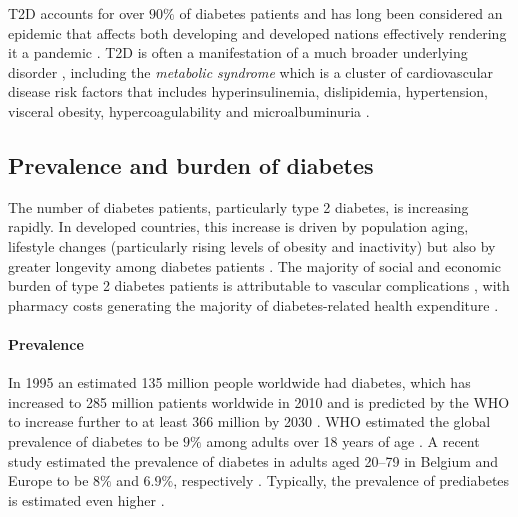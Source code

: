 T2D accounts for over $90\%$ of diabetes patients and has long been considered an epidemic that affects both developing and developed nations \citep{zimmet1999diabetes,zimmet2001global,rocchini2002childhood,nathan2007impaired,chen2012worldwide, lam2012worldwide} effectively rendering it a pandemic \citep{beulens2010global}. T2D is often a manifestation of a much broader underlying disorder \citep{reaven1988role, zimmet1999diabetes}, including the \emph{metabolic syndrome} which is a cluster of cardiovascular disease risk factors that includes hyperinsulinemia, dislipidemia, hypertension, visceral obesity, hypercoagulability and microalbuminuria \citep{alberti2005metabolic, zimmet2001global, federation2010idf}. 


\subsection{Prevalence and burden of diabetes}
The number of diabetes patients, particularly type 2 diabetes, is increasing rapidly. In developed countries, this increase is driven by population aging, lifestyle changes (particularly rising levels of obesity and inactivity) but also by greater longevity among diabetes patients \citep{stovring2003rising,beulens2010global}. The majority of social and economic burden of type 2 diabetes patients is attributable to vascular complications \citep{beulens2010global}, with pharmacy costs generating the majority of diabetes-related health expenditure \citep{nichols2002impact, gandra2006total}.

\paragraph{Prevalence} In 1995 an estimated 135 million people worldwide had diabetes, which has increased to 285 million patients worldwide in 2010 \citep{shaw2010global, chen2012worldwide} and is predicted by the WHO to increase further to at least 366 million by 2030 \citep{smyth2006diabetes}. WHO estimated the global prevalence of diabetes to be $9\%$ among adults over 18 years of age \citep{alwan2011global}. A recent study estimated the prevalence of diabetes in adults aged 20--79 in Belgium and Europe to be $8\%$ and $6.9\%$, respectively \citep{shaw2010global}. Typically, the prevalence of prediabetes is estimated even higher \citep{cowie2009full,yang2010prevalence,chen2012worldwide}.

